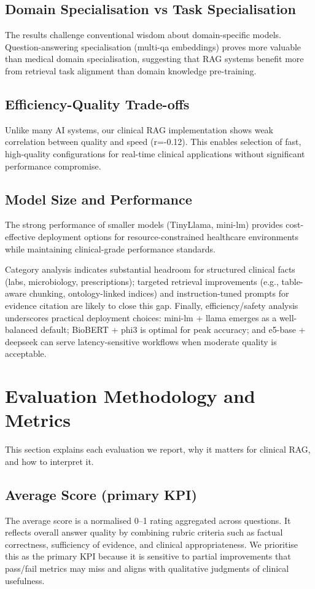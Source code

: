 \subsection{Domain Specialisation vs Task Specialisation}
The results challenge conventional wisdom about domain-specific models. Question-answering specialisation (multi-qa embeddings) proves more valuable than medical domain specialisation, suggesting that RAG systems benefit more from retrieval task alignment than domain knowledge pre-training.

\subsection{Efficiency-Quality Trade-offs}
Unlike many AI systems, our clinical RAG implementation shows weak correlation between quality and speed (r=-0.12). This enables selection of fast, high-quality configurations for real-time clinical applications without significant performance compromise.

\subsection{Model Size and Performance}
The strong performance of smaller models (TinyLlama, mini-lm) provides cost-effective deployment options for resource-constrained healthcare environments while maintaining clinical-grade performance standards.

Category analysis indicates substantial headroom for structured clinical facts (labs, microbiology, prescriptions); targeted retrieval improvements (e.g., table-aware chunking, ontology-linked indices) and instruction-tuned prompts for evidence citation are likely to close this gap. Finally, efficiency/safety analysis underscores practical deployment choices: mini-lm + llama emerges as a well-balanced default; BioBERT + phi3 is optimal for peak accuracy; and e5-base + deepseek can serve latency-sensitive workflows when moderate quality is acceptable.

\section{Evaluation Methodology and Metrics}
This section explains each evaluation we report, why it matters for clinical RAG, and how to interpret it.

\subsection{Average Score (primary KPI)}
The average score is a normalised 0--1 rating aggregated across questions. It reflects overall answer quality by combining rubric criteria such as factual correctness, sufficiency of evidence, and clinical appropriateness. We prioritise this as the primary KPI because it is sensitive to partial improvements that pass/fail metrics may miss and aligns with qualitative judgments of clinical usefulness.


